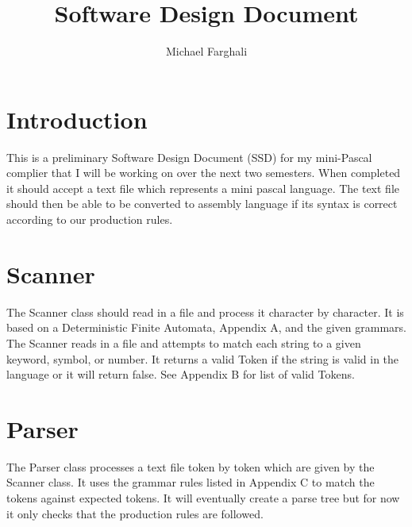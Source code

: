 \documentclass[10]{article}
\title{Software Design Document}
\author{Michael Farghali}
\begin{document}
\maketitle



\section*{Introduction}
This is a preliminary Software Design Document (SSD) for my mini-Pascal complier that I will be working on over the next two semesters. When completed it should accept a text file which represents a mini pascal language. The text file should then be able to be converted to assembly language if its syntax is correct according to our production rules. 
\section*{Scanner}
The Scanner class should read in a file and process it character by character. It is based on a Deterministic Finite Automata, Appendix A, and the given grammars. The Scanner reads in a file and attempts to match each string to a given keyword, symbol, or number. It returns a valid Token if the string is valid in the language or it will return false. See Appendix B for list of valid Tokens.

\section*{Parser}
The Parser class processes a text file token by token which are given by the Scanner class. It uses the grammar rules listed in Appendix C to match the tokens against expected tokens. It will eventually create a parse tree but for now it only checks that the production rules are followed. 
\end{document}
